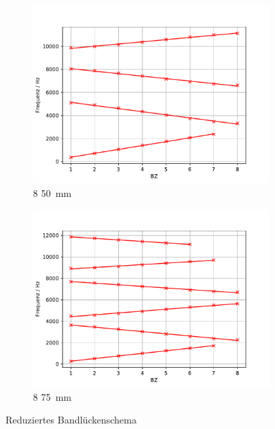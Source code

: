 \begin{figure}
 \centering
 \begin{subfigure}{0.48\textwidth}
  \centering
  \includegraphics[width=1\textwidth]{RedBandSchem.pdf}
  \caption{8 \cdot \SI{50}{mm}}
  \label{fig.RedBandSchem}
 \end{subfigure}
 \begin{subfigure}{0.48\textwidth}
  \centering
  \includegraphics[width=1\textwidth]{RedBandSchem75.pdf}
  \caption{8 \cdot \SI{75}{mm}}
  \label{fig.RedBandSchem75}
 \end{subfigure}
 \caption{Reduziertes Bandlückenschema}
\end{figure}



